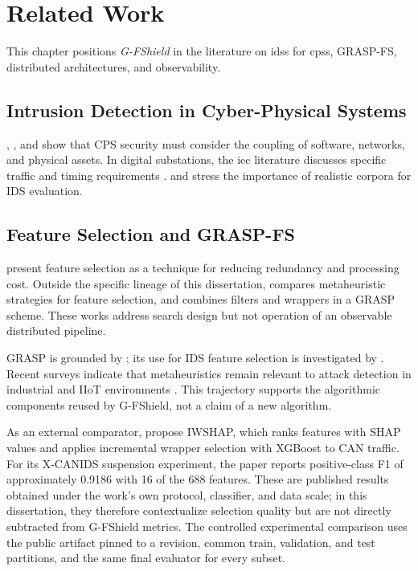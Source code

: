 \chapter{Related Work}
\label{chapter:relacionados}

This chapter positions \textit{G-FShield} in the literature on \acp{ids} for \acp{cps}, GRASP-FS, distributed architectures, and observability.

\section{Intrusion Detection in Cyber-Physical Systems}

, , and  show that CPS security must consider the coupling of software, networks, and physical assets. In digital substations, the \ac{iec} literature discusses specific traffic and timing requirements \cite{iec61850,mackiewicz2006overview,aftab2020iec}.  and  stress the importance of realistic corpora for IDS evaluation.

\section{Feature Selection and GRASP-FS}

 present feature selection as a technique for reducing redundancy and processing cost. Outside the specific lineage of this dissertation,  compares metaheuristic strategies for feature selection, and  combines filters and wrappers in a GRASP scheme. These works address search design but not operation of an observable distributed pipeline.

GRASP is grounded by ; its use for IDS feature selection is investigated by . Recent surveys indicate that metaheuristics remain relevant to attack detection in industrial and IIoT environments \cite{Termanini2025Survey,Francis2026MFSReview}. This trajectory supports the algorithmic components reused by G-FShield, not a claim of a new algorithm.

As an external comparator,  propose IWSHAP, which ranks features with SHAP values and applies incremental wrapper selection with XGBoost to CAN traffic. For its X-CANIDS suspension experiment, the paper reports positive-class F1 of approximately 0.9186 with 16 of the 688 features. These are published results obtained under the work's own protocol, classifier, and data scale; in this dissertation, they therefore contextualize selection quality but are not directly subtracted from G-FShield metrics. The controlled experimental comparison uses the public artifact pinned to a revision, common train, validation, and test partitions, and the same final evaluator for every subset.

